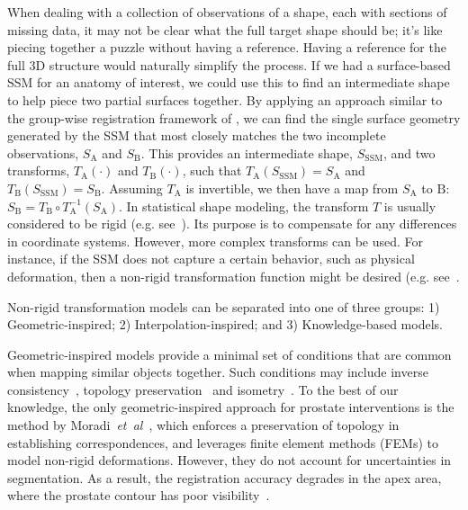 \documentclass[journal]{IEEEtran}
\begin{document}
When dealing with a collection of observations of a shape, each with sections of missing data, it may not be clear what the full target shape should be; it's like piecing together a puzzle without having a reference.  Having a reference for the full 3D structure would naturally simplify the process.  If we had a surface-based SSM for an anatomy of interest, we could use this to find an intermediate shape to help piece two partial surfaces together.  By applying an approach similar to the group-wise registration framework of \cite{Rasoulian12b}, we can find the single surface geometry generated by the SSM that most closely matches the two incomplete observations, $S_\mathrm{A}$ and $S_\mathrm{B}$.  This provides an intermediate shape, $S_\mathrm{SSM}$, and two transforms, $T_\mathrm{A}(\cdot)$ and $T_\mathrm{B}(\cdot)$, such that $T_\mathrm{A}\left(S_\mathrm{SSM}\right) = S_\mathrm{A}$ and $T_\mathrm{B}\left(S_\mathrm{SSM}\right) = S_\mathrm{B}$.  Assuming $T_\mathrm{A}$ is invertible, we then have a map from $S_\mathrm{A}$ to $\mathrm{B}$: $S_\mathrm{B} = T_\mathrm{B}\circ T_\mathrm{A}^{-1}\left(S_\mathrm{A}\right)$.  In statistical shape modeling, the transform $T$ is usually considered to be rigid (e.g. see~\cite{Berendsen13a,Baka11a}).  Its purpose is to compensate for any differences in coordinate systems.  However, more complex transforms can be used.  For instance, if the SSM does not capture a certain behavior, such as physical deformation, then a non-rigid transformation function might be desired (e.g. see~\cite{Rasoulian13a}.

Non-rigid transformation models can be separated into one of three groups: 1) Geometric-inspired; 2) Interpolation-inspired; and 3) Knowledge-based models.

Geometric-inspired models provide a minimal set of conditions that are common when mapping similar objects together. Such conditions may include inverse consistency~\cite{Combes10a}, topology preservation~\cite{Huang07a,Yeo10a,Moradi12a} and isometry~\cite{Zheng10a}. To the best of our knowledge, the only geometric-inspired approach for prostate interventions is the method by Moradi~\textit{et~al}~\cite{Moradi12a}, which enforces a preservation of topology in establishing correspondences, and leverages finite element methods (FEMs) to model non-rigid deformations. However, they do not account for uncertainties in segmentation. As a result, the registration accuracy degrades in the apex area, where the prostate contour has poor visibility~\cite{Moradi12a}.
\end{document}
